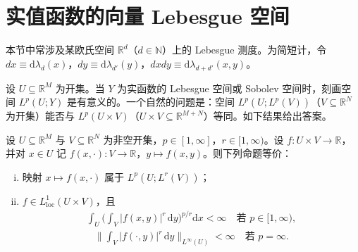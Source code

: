 \documentclass[../../main.tex]{subfiles}%
\begin{document}
\section{实值函数的向量 Lebesgue 空间}\label{section:ch04-实值向量Lp}

本节中常涉及某欧氏空间 $\mathbb{R}^d$（$d\in\mathbb{N}$）上的 Lebesgue 测度。为简短计，令 $dx\equiv\mathrm{d}\lambda_d(x)$，$dy\equiv\mathrm{d}\lambda_{d'}(y)$，$dxdy\equiv\mathrm{d}\lambda_{d+d'}(x,y)$。

设 $U\subseteq\mathbb{R}^M$ 为开集。当 $Y$ 为实函数的 Lebesgue 空间或 Sobolev 空间时，刻画空间 $L^p(U;Y)$ 是有意义的。一个自然的问题是：空间 $L^p(U;L^p(V))$（$V\subseteq\mathbb{R}^N$ 为开集）能否与 $L^p(U\times V)$（$U\times V\subseteq\mathbb{R}^{M+N}$）等同。如下结果给出答案。

\begin{proposition}\label{proposition:ch04-LpULpV}
设 $U\subseteq\mathbb{R}^M$ 与 $V\subseteq\mathbb{R}^N$ 为非空开集，$p\in[1,\infty]$，$r\in[1,\infty)$。设 $f:U\times V\to\mathbb{R}$，并对 $x\in U$ 记 $f(x,\cdot):V\to\mathbb{R}$，$y\mapsto f(x,y)$。则下列命题等价：
\begin{enumerate}[(i)]
\item\label{item:ch04-LpULpV-i} 映射 $x\mapsto f(x,\cdot)$ 属于 $L^p(U;L^r(V))$；
\item\label{item:ch04-LpULpV-ii} $f\in L^1_{\mathrm{loc}}(U\times V)$，且
\begin{align}
\int_U\Big(\int_V|f(x,y)|^r\,\mathrm{d}y\Big)^{p/r}\mathrm{d}x<\infty\quad\text{若 }p\in[1,\infty), \label{align:ch04-4.118a}
\end{align}
\begin{align}
\Big\|\int_V|f(\cdot,y)|^r\,\mathrm{d}y\Big\|_{L^\infty(U)}<\infty\quad\text{若 }p=\infty. \label{align:ch04-4.118b}
\end{align}
\end{enumerate}
\end{proposition}
\end{document}
